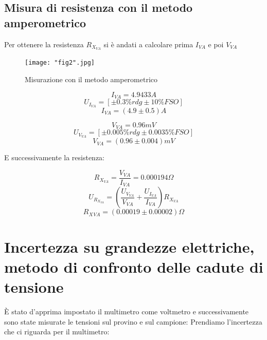 \documentclass[a4paper]{article}
\begin{document}
\subsection{Misura di resistenza con il metodo amperometrico}
Per ottenere la resistenza $R_{X_{VA}}$ si è andati a calcolare prima $I_{VA}$ e poi $V_{VA}$
\begin{figure}[htp]
	\centering
	\texttt{[image: "fig2".jpg]}
	\caption{Misurazione  con il metodo amperometrico}
	\label{}
\end{figure}
\begin{Large}
	\begin{equation}
		I_{VA}= 4.9433 A
	\end{equation}
	\begin{equation}
		U_{I_{VA}} = [\pm 0.3\%rdg \pm 10\% FSO]
	 \end{equation}
	 \begin{equation}
		I_{VA} = (4.9 \pm 0.5) A
	 \end{equation}
\end{Large}

\begin{Large}
	\begin{equation}
		V_{VA}= 0.96 mV
	\end{equation}
	\begin{equation}
		U_{V_{VA}} = [\pm 0.005\%rdg \pm 0.0035\% FSO]
	 \end{equation}
	 \begin{equation}
		V_{VA} = (0.96 \pm 0.004) mV
	 \end{equation}
\end{Large}
E successivamente la resistenza:
\begin{Large}
	\begin{equation}
		R_{X_{VA}}= \frac{V_{VA}}{I_{VA}} =0.000194 \Omega
	\end{equation}
	\begin{equation}
		U_{R_{X_{VA}}} = (\frac{U_{V_{VA}}}{V_{VA}}+\frac{U_{I_{VA}}}{I_{VA}})R_{X_{VA}}
	 \end{equation}
	 \begin{equation}
		R_X{_{VA}} = (0.00019\pm 0.00002)\Omega
	 \end{equation}
\end{Large}

\section {Incertezza su grandezze elettriche, metodo di confronto delle cadute di tensione}
È stato d'apprima impostato il multimetro come voltmetro e successivamente sono state misurate le tensioni sul provino e sul campione:
Prendiamo l'incertezza che ci riguarda per il multimetro:
\end{document}
